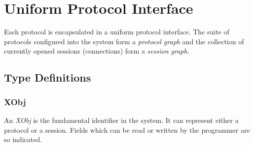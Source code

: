 % 
%
%

\section{Uniform Protocol Interface}

Each \xk{} protocol is encapsulated in a uniform protocol interface.
The suite of protocols configured into the system form a {\em protocol
graph} and the collection of currently opened sessions (connections)
form a {\em session graph}.

\subsection{Type Definitions}

\subsubsection{XObj}

An {\em XObj} is the fundamental identifier in the system.  It can
represent either a protocol or a session.  Fields which can be read or
written by the programmer are so indicated.

